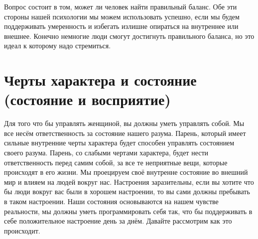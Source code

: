 Вопрос состоит в том, может ли человек найти правильный баланс. Обе эти стороны нашей психологии мы можем использовать успешно, если мы будем поддерживать умеренность и избегать излишне опираться на внутреннее или внешнее. Конечно немногие люди смогут достигнуть правильного баланса, но это идеал к которому надо стремиться.

\chapter{Черты характера и состояние (состояние и восприятие)}

Для того что бы управлять женщиной, вы должны уметь управлять собой. Мы все несём ответственность за состояние нашего разума. Парень, который имеет сильные внутренние черты характера будет способен управлять состоянием своего разума. Парень, со слабыми чертами характера, будет нести ответственность перед самим собой, за все те неприятные вещи, которые происходят в его жизни. Мы проецируем своё внутренне состояние во внешний мир и влияем на людей вокруг нас. Настроения заразительны, если вы хотите что бы люди вокруг вас были в хорошем настроении, то вы сами должны пребывать в таком настроении. Наши состояния основываются на нашем чувстве реальности, мы должны уметь программировать себя так, что бы поддерживать в себе положительное настроение день за днём. Давайте рассмотрим как это происходит.

